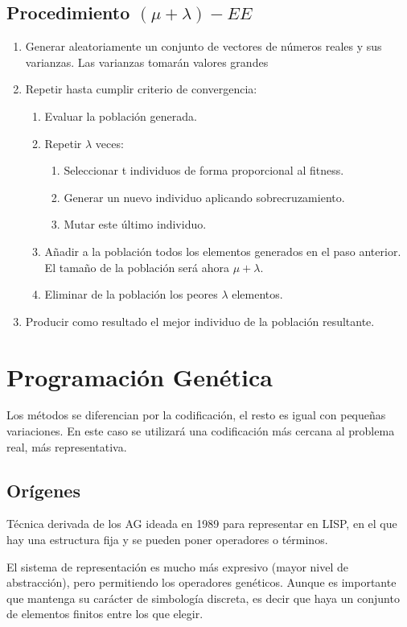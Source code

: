 \documentclass[12pt, twoside, openright]{report} %
\begin{document}
\subsection{Procedimiento $(\mu + \lambda)-EE$}
\begin{enumerate}
	\item Generar aleatoriamente un conjunto de vectores de números reales y sus varianzas. Las varianzas tomarán valores grandes
	\item Repetir hasta cumplir criterio de convergencia:
	\begin{enumerate}
		\item Evaluar la población generada.
		\item Repetir $\lambda$ veces:
		\begin{enumerate}
			\item Seleccionar t individuos de forma proporcional al fitness.
			\item Generar un nuevo individuo aplicando sobrecruzamiento.
			\item Mutar este último individuo.
		\end{enumerate}
		\item Añadir a la población todos los elementos generados en el paso anterior. El tamaño de la población será ahora $\mu + \lambda$.
		\item Eliminar de la población los peores $\lambda$ elementos.
	\end{enumerate}
	\item Producir como resultado el mejor individuo de la población resultante.
\end{enumerate}

\section{Programación Genética}
Los métodos se diferencian por la codificación, el resto es igual con pequeñas variaciones. En este caso se utilizará una codificación más cercana al problema real, más representativa.

\subsection{Orígenes}
Técnica derivada de los AG ideada en 1989 para representar en LISP, en el que hay una estructura fija y se pueden poner operadores o términos.

El sistema de representación es mucho más expresivo (mayor nivel de abstracción), pero permitiendo los operadores genéticos. Aunque es importante que mantenga su carácter de simbología discreta, es decir que haya un conjunto de elementos finitos entre los que elegir.
\end{document}
